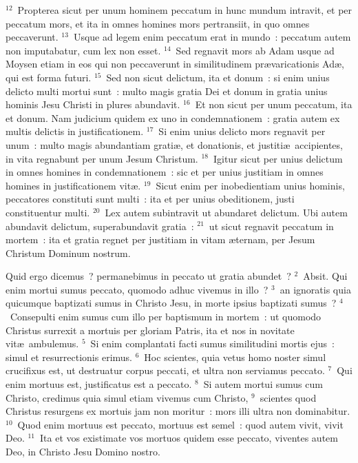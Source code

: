 ${}^{12}$~Propterea sicut per unum hominem peccatum in hunc mundum intravit, et per peccatum mors, et ita in omnes homines mors pertransiit, in quo omnes peccaverunt.
${}^{13}$~Usque ad legem enim peccatum erat in mundo~: peccatum autem non imputabatur, cum lex non esset.
${}^{14}$~Sed regnavit mors ab Adam usque ad Moysen etiam in eos qui non peccaverunt in similitudinem pr\ae varicationis Ad\ae , qui est forma futuri.
${}^{15}$~Sed non sicut delictum, ita et donum~: si enim unius delicto multi mortui sunt~: multo magis gratia Dei et donum in gratia unius hominis Jesu Christi in plures abundavit.
${}^{16}$~Et non sicut per unum peccatum, ita et donum. Nam judicium quidem ex uno in condemnationem~: gratia autem ex multis delictis in justificationem.
${}^{17}$~Si enim unius delicto mors regnavit per unum~: multo magis abundantiam grati\ae , et donationis, et justiti\ae\ accipientes, in vita regnabunt per unum Jesum Christum.
${}^{18}$~Igitur sicut per unius delictum in omnes homines in condemnationem~: sic et per unius justitiam in omnes homines in justificationem vit\ae .
${}^{19}$~Sicut enim per inobedientiam unius hominis, peccatores constituti sunt multi~: ita et per unius obeditionem, justi constituentur multi.
${}^{20}$~Lex autem subintravit ut abundaret delictum. Ubi autem abundavit delictum, superabundavit gratia~:
${}^{21}$~ut sicut regnavit peccatum in mortem~: ita et gratia regnet per justitiam in vitam \ae ternam, per Jesum Christum Dominum nostrum.

\lettrine[lines=3,image=true,loversize=0.05,lraise=-0.03]{Q}{}uid ergo dicemus~? permanebimus in peccato ut gratia abundet~?
${}^{2}$~Absit. Qui enim mortui sumus peccato, quomodo adhuc vivemus in illo~?
${}^{3}$~an ignoratis quia quicumque baptizati sumus in Christo Jesu, in morte ipsius baptizati sumus~?
${}^{4}$~Consepulti enim sumus cum illo per baptismum in mortem~: ut quomodo Christus surrexit a mortuis per gloriam Patris, ita et nos in novitate vit\ae\ ambulemus.
${}^{5}$~Si enim complantati facti sumus similitudini mortis ejus~: simul et resurrectionis erimus.
${}^{6}$~Hoc scientes, quia vetus homo noster simul crucifixus est, ut destruatur corpus peccati, et ultra non serviamus peccato.
${}^{7}$~Qui enim mortuus est, justificatus est a peccato.
${}^{8}$~Si autem mortui sumus cum Christo, credimus quia simul etiam vivemus cum Christo,
${}^{9}$~scientes quod Christus resurgens ex mortuis jam non moritur~: mors illi ultra non dominabitur.
${}^{10}$~Quod enim mortuus est peccato, mortuus est semel~: quod autem vivit, vivit Deo.
${}^{11}$~Ita et vos existimate vos mortuos quidem esse peccato, viventes autem Deo, in Christo Jesu Domino nostro.


